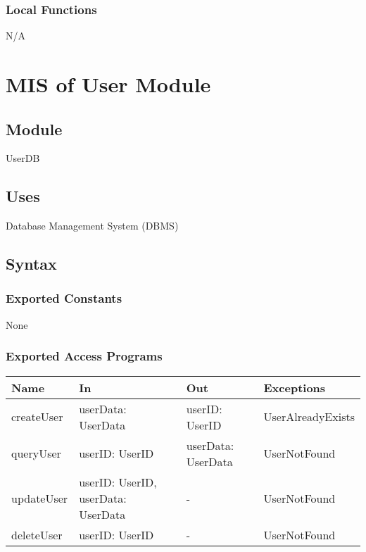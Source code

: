 \documentclass[12pt, titlepage]{article}
\begin{document}
\subsubsection{Local Functions}
N/A


\newpage
\section{MIS of User Module} \label{UserModule}

\subsection{Module}

UserDB

\subsection{Uses}

Database Management System (DBMS)

\subsection{Syntax}

\subsubsection{Exported Constants}

None

\subsubsection{Exported Access Programs}

\begin{center}
\begin{tabular}{p{2cm} p{4cm} p{4cm} p{2cm}}
\hline
\textbf{Name} & \textbf{In} & \textbf{Out} & \textbf{Exceptions} \\
\hline
createUser & userData: UserData & userID: UserID & UserAlreadyExists \\
queryUser & userID: UserID & userData: UserData & UserNotFound \\
updateUser & userID: UserID, userData: UserData & - & UserNotFound \\
deleteUser & userID: UserID & - & UserNotFound \\
\hline
\end{tabular}
\end{center}
\end{document}
